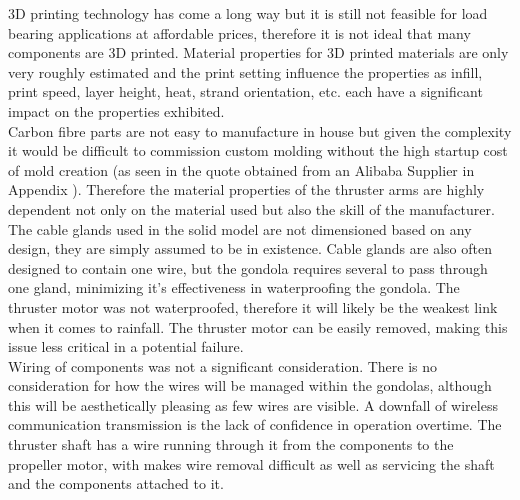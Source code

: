 \documentclass[../main.tex]{subfiles}
\begin{document}
3D printing technology has come a long way but it is still not feasible for load bearing applications at affordable prices, therefore it is not ideal that many components are 3D printed. Material properties for 3D printed materials are only very roughly estimated and the print setting influence the properties as infill, print speed, layer height, heat, strand orientation, etc. each have a significant impact on the properties exhibited.
\\
Carbon fibre parts are not easy to manufacture in house but given the complexity it would be difficult to commission custom molding without the high startup cost of mold creation (as seen in the quote obtained from an Alibaba Supplier in Appendix \cite{KEELQUOTE}). Therefore the material properties of the thruster arms are highly dependent not only on the material used but also the skill of the manufacturer.
\\
The cable glands used in the solid model are not dimensioned based on any design, they are simply assumed to be in existence. Cable glands are also often designed to contain one wire, but the gondola requires several to pass through one gland, minimizing it's effectiveness in waterproofing the gondola. The thruster motor was not waterproofed, therefore it will likely be the weakest link when it comes to rainfall. The thruster motor can be easily removed, making this issue less critical in a potential failure. 
\\
Wiring of components was not a significant consideration. There is no consideration for how the wires will be managed within the gondolas, although this will be aesthetically pleasing as few wires are visible. A downfall of wireless communication transmission is the lack of confidence in operation overtime. The thruster shaft has a wire running through it from the components to the propeller motor, with makes wire removal difficult as well as servicing the shaft and the components attached to it.
\\
\end{document}
